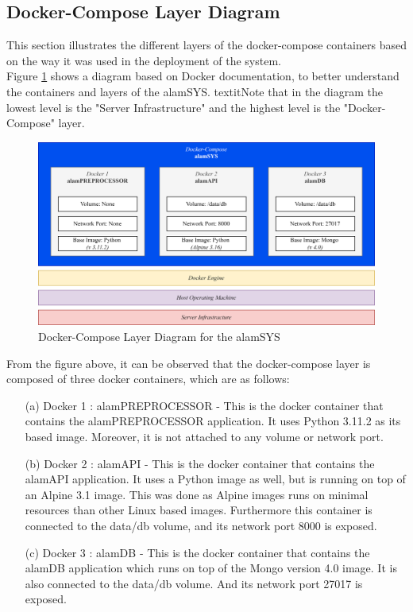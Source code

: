 \subsection{Docker-Compose Layer Diagram}
\label{subsec:docker_compose_diagram}
This section illustrates the different layers of the docker-compose 
containers based on the way it was used in the 
deployment of the system.
\hfill \\

Figure \ref{fig:docker_compose_layout} shows a diagram based
on Docker documentation, to better understand the containers and layers
of the alamSYS. textit{Note that in the diagram the lowest level is the "Server Infrastructure"
and the highest level is the "Docker-Compose" layer.}
\begin{figure}[ht]
    \centering
    \includegraphics[width=1\textwidth]{./assets/Chapter_3/Docker-Compose Layout.png}
    \caption{Docker-Compose Layer Diagram for the alamSYS}
    \label{fig:docker_compose_layout}
\end{figure}
\FloatBarrier

From the figure above, it can be observed that the docker-compose layer is composed
of three docker containers, which are as follows:
\begin{itemize}
    \item[(a)] Docker 1 : alamPREPROCESSOR - This is the docker container that contains
    the alamPREPROCESSOR application. It uses Python 3.11.2 as its based image. Moreover,
    it is not attached to any volume or network port.
    \item[(b)] Docker 2 : alamAPI - This is the docker container that contains the alamAPI
    application. It uses a Python image as well, but is running on top of an Alpine 3.1 image.
    This was done as Alpine images runs on minimal resources than other Linux based images.
    Furthermore this container is connected to the data/db volume, and its network port
    8000 is exposed.
    \item[(c)] Docker 3 : alamDB - This is the docker container that contains the alamDB application
    which runs on top of the Mongo version 4.0 image. It is also connected to the data/db volume.
    And its network port 27017 is exposed.
\end{itemize}